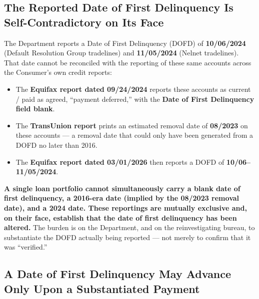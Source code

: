 
\subsection*{The Reported Date of First Delinquency Is Self-Contradictory on Its Face}

The Department reports a Date of First Delinquency (DOFD) of \textbf{10/06/2024} (Default Resolution Group tradelines) and \textbf{11/05/2024} (Nelnet tradelines). That date cannot be reconciled with the reporting of these same accounts across the Consumer's own credit reports:

\begin{itemize}[noitemsep]
  \item The \textbf{Equifax report dated 09/24/2024} reports these accounts as current / paid as agreed, ``payment deferred,'' with the \textbf{Date of First Delinquency field blank}.
  \item The \textbf{TransUnion report} prints an estimated removal date of \textbf{08/2023} on these accounts --- a removal date that could only have been generated from a DOFD no later than 2016.
  \item The \textbf{Equifax report dated 03/01/2026} then reports a DOFD of \textbf{10/06--11/05/2024}.
\end{itemize}

\textbf{A single loan portfolio cannot simultaneously carry a blank date of first delinquency, a 2016-era date (implied by the 08/2023 removal date), and a 2024 date. These reportings are mutually exclusive and, on their face, establish that the date of first delinquency has been altered.} The burden is on the Department, and on the reinvestigating bureau, to substantiate the DOFD actually being reported --- not merely to confirm that it was ``verified.''

\subsection*{A Date of First Delinquency May Advance Only Upon a Substantiated Payment}


